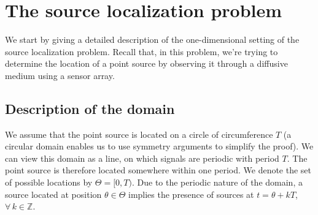 \documentclass[conference]{IEEEtran}
\begin{document}


\section{The source localization problem}
\label{sec:source-localization}

We start by giving a detailed description of the one-dimensional setting of the
source localization problem. Recall that, in this problem, we're trying to
determine the location of a point source by observing it through a diffusive
medium using a sensor array.

\subsection{Description of the domain}

We assume that the point source is located on a circle of circumference $T$ (a
circular domain enables us to use symmetry arguments to simplify the proof). We
can view this domain as a line, on which signals are periodic with period $T$.
The point source is therefore located somewhere within one period. We denote
the set of possible locations by $\Theta = [0, T)$. Due to the periodic nature
of the domain, a source located at position $\theta \in \Theta$ implies the
presence of sources at $t = \theta + kT$,~$\forall \, k \in \mathbb Z$.
\end{document}
